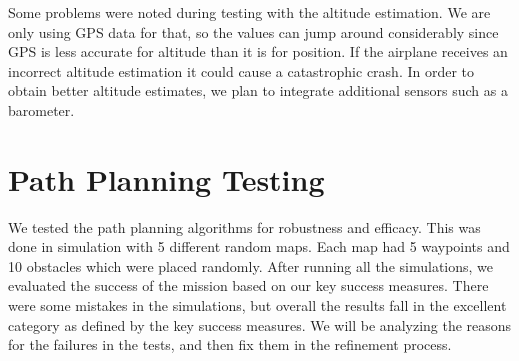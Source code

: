 \documentclass[]{auvsi_doc}
\begin{document}
Some problems were noted during testing with the altitude estimation. We are only using GPS data for that, so the values can jump around considerably since GPS is less accurate for altitude than it is for position. If the airplane receives an incorrect altitude estimation it could cause a catastrophic crash. In order to obtain better altitude estimates, we plan to integrate additional sensors such as a barometer. 

\section{Path Planning Testing}

We tested the path planning algorithms for robustness and efficacy. This was done in simulation with 5 different random maps. Each map had 5 waypoints and 10 obstacles which were placed randomly. After running all the simulations, we evaluated the success of the mission based on our key success measures. There were some mistakes in the simulations, but overall the results fall in the excellent category as defined by the key success measures. We will be analyzing the reasons for the failures in the tests, and then fix them in the refinement process. 
\end{document}

